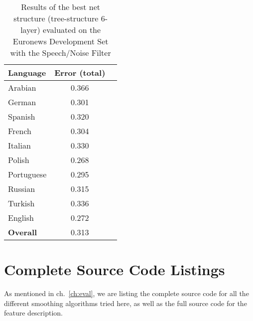 \begin{table}[!htbp]
\centering
\caption{Results of the best net structure (tree-structure 6-layer) evaluated on the Euronews Development Set with the Speech/Noise Filter}
\label{tab:speech}
\begin{tabular}{| l | c | r | }
	\hline
	\textbf{Language} & \textbf{Error (total) }  \\
	\hline
	Arabian & 0.366  \\
	German & 0.301  \\
	Spanish & 0.320 \\ 
	French & 0.304 \\
	Italian & 0.330  \\
	Polish & 0.268 \\
	Portuguese& 0.295 \\
	Russian&  0.315 \\
	Turkish&  0.336 \\
	English&  0.272 \\
	\hline
	\textbf{Overall} & 0.313 \\
	\hline
\end{tabular}
\end{table}

\FloatBarrier
\clearpage
\section{Complete Source Code Listings}

As mentioned in ch.~\ref{ch:eval}, we are listing the complete source code for all the different smoothing algorithms tried here, as well as the full source code for the feature description.


